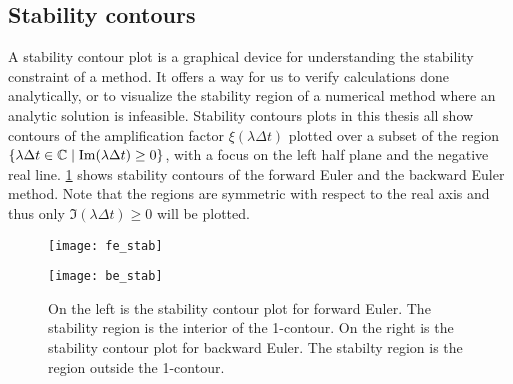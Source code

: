 \subsection{Stability contours}
A stability contour plot is a graphical device for understanding the stability constraint of a method. It offers a way for us to verify calculations done analytically, or to visualize the stability region of a numerical method where an analytic solution is infeasible. Stability contours plots in this thesis all show contours of the amplification factor $\xi(\lambda\Delta t)$ plotted over a subset of the region $\{\lambda\Delta t \in \mathbb{C} \mid \operatorname{Im}(\lambda\Delta t) \geq 0\}$, with a focus on the left half plane and the negative real line. \cref{fig:FE BE stab cont} shows stability contours of the forward Euler and the backward Euler method. Note that the regions are symmetric with respect to the real axis and thus only $\Im(\lambda\Delta t) \geq 0$ will be plotted.

\begin{figure}[htb!]
	\centering
\begin{minipage}{0.45\textwidth}
\texttt{[image: fe\_stab]}
\end{minipage}
\begin{minipage}{0.45\textwidth}
\texttt{[image: be\_stab]}
\end{minipage}
\caption[Examples of stability contour plots.]{On the left is the stability contour plot for forward Euler. The stability region is the interior of the 1-contour. On the right is the stability contour plot for backward Euler. The stabilty region is the region outside the 1-contour.}
\label{fig:FE BE stab cont}
\end{figure}

